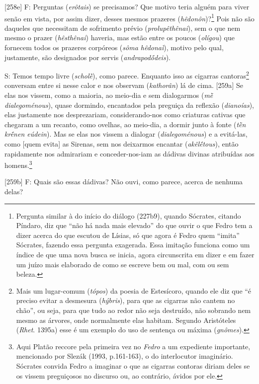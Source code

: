 {[}258e{]} F: Perguntas (\emph{erôtais}) se precisamos? Que motivo teria
alguém para viver senão em vista, por assim dizer, desses mesmos
prazeres (\emph{hêdonôn})?\footnote{Pergunta similar à do início do
  diálogo (227b9), quando Sócrates, citando Píndaro, diz que ``não há
  nada mais elevado'' do que ouvir o que Fedro tem a dizer acerca do que
  escutou de Lísias, só que agora é Fedro quem ``imita'' Sócrates,
  fazendo essa pergunta exagerada. Essa imitação funciona como um índice
  de que uma nova busca se inicia, agora circunscrita em dizer e em
  fazer um juízo mais elaborado de como se escreve bem ou mal, com ou
  sem beleza.} Pois não são daqueles que necessitam de sofrimento prévio
(\emph{prolupêthênai}), sem o que nem mesmo o prazer (\emph{hêsthênai})
haveria, mas estão entre os poucos (\emph{olígou}) que fornecem todos os
prazeres corpóreos (\emph{sôma hêdonaì}), motivo pelo qual, justamente,
são designados por servis (\emph{andrapodṓdeis}).

S: Temos tempo livre (\emph{scholḕ}), como parece. Enquanto isso as
cigarras cantoras\footnote{Mais um lugar-comum (\emph{tópos}) da poesia
  de Estesícoro, quando ele diz que ``é preciso evitar a desmesura
  (\emph{hýbris}), para que as cigarras não cantem no chão'', ou seja,
  para que tudo ao redor não seja destruído, não sobrando nem mesmo as
  árvores, onde normalmente elas habitam. Segundo Aristóteles
  (\emph{Rhet}. 1395a) esse é um exemplo do uso de sentença ou máxima
  (\emph{gnômes}).} conversam entre si nesse calor e nos observam
(\emph{kathorân}) lá de cima. {[}259a{]} Se elas nos vissem, como a
maioria, ao meio-dia e sem dialogarmos (\emph{mḕ dialegoménous}), quase
dormindo, encantados pela preguiça da reflexão (\emph{dianoías}), elas
justamente nos desprezariam, considerando-nos como criaturas cativas que
chegaram a um recanto, como ovelhas, ao meio-dia, a dormir junto à fonte
(\emph{tḕn krḗnen eúdein}). Mas se elas nos vissem a dialogar
(\emph{dialegoménous}) e a evitá-las, como {[}quem evita{]} as Sirenas,
sem nos deixarmos encantar (\emph{akêlḗtous}), então rapidamente nos
admirariam e conceder-nos-iam as dádivas divinas atribuídas aos
homens.\footnote{Aqui Platão reccore pela primeira vez no \emph{Fedro} a
  um expediente importante, mencionado por Slezák (1993, p.161-163), o
  do interlocutor imaginário. Sócrates convida Fedro a imaginar o que as
  cigarras contoras diriam deles se os vissem preguiçosos no discurso
  ou, ao contrário, ávidos por ele.}

{[}259b{]} F: Quais são essas dádivas? Não ouvi, como parece, acerca de
nenhuma delas?

